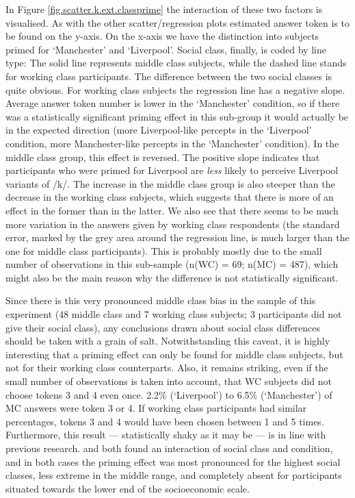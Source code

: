 In Figure \ref{fig.scatter.k.ext.classprime} the interaction of these two factors is visualised.
As with the other scatter/regression plots estimated answer token is to be found on the y-axis.
On the x-axis we have the distinction into subjects primed for `Manchester' and `Liverpool'.
Social class, finally, is coded by line type: The solid line represents middle class subjects, while the dashed line stands for working class participants.
The difference between the two social classes is quite obvious.
For working class subjects the regression line has a negative slope.
Average answer token number is lower in the `Manchester' condition, so if there was a statistically significant priming effect in this sub-group it would actually be in the expected direction (more Liverpool-like percepts in the `Liverpool' condition, more Manchester-like percepts in the `Manchester' condition).
In the middle class group, this effect is reversed.
The positive slope indicates that participants who were primed for Liverpool are \emph{less} likely to perceive Liverpool variants of /k/.
The increase in the middle class group is also steeper than the decrease in the working class subjects, which suggests that there is more of an effect in the former than in the latter.
We also see that there seems to be much more variation in the answers given by working class respondents (the standard error, marked by the grey area around the regression line, is much larger than the one for middle class participants).
This is probably mostly due to the small number of observations in this sub-sample (n(WC) = 69; n(MC) = 487), which might also be the main reason why the difference is not statistically significant.

Since there is this very pronounced middle class bias in the sample of this experiment (48 middle class and 7 working class subjects; 3 participants did not give their social class), any conclusions drawn about social class differences should be taken with a grain of salt.
Notwithstanding this caveat, it is highly interesting that a priming effect can only be found for middle class subjects, but not for their working class counterparts.
Also, it remains striking, even if the small number of observations is taken into account, that WC subjects did not choose tokens 3 and 4 even once.
2.2\% (`Liverpool') to 6.5\% (`Manchester') of MC answers were token 3 or 4.
If working class participants had similar percentages, tokens 3 and 4 would have been chosen between 1 and 5 times.
Furthermore, this result --- statistically shaky as it may be --- is in line with previous research.
\textcite{hayetal2006a} and \textcite{haydrager2010} both found an interaction of social class and condition, and in both cases the priming effect was most pronounced for the highest social classes, less extreme in the middle range, and completely absent for participants situated towards the lower end of the socioeconomic scale.

